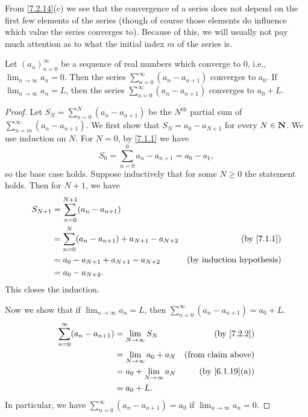 \begin{note}
  From \cref{7.2.14}(c) we see that the convergence of a series does not depend on the first few elements of the series
  (though of course those elements do influence which value the series converges to).
  Because of this, we will usually not pay much attention as to what the initial index \(m\) of the series is.
\end{note}

\begin{lemma}\label{7.2.15}
  Let \((a_n)_{n = 0}^\infty\) be a sequence of real numbers which converge to \(0\), i.e., \(\lim_{n \to \infty} a_n = 0\).
  Then the series \(\sum_{n = 0}^\infty (a_n - a_{n + 1})\) converges to \(a_0\).
  If \(\lim_{n \to \infty} a_n = L\), then the series \(\sum_{n = 0}^\infty (a_n - a_{n + 1})\) converges to \(a_0 + L\).
\end{lemma}

\begin{proof}
  Let \(S_N = \sum_{n = 0}^N (a_n - a_{n + 1})\) be the \(N^{\text{th}}\) partial sum of \(\sum_{n = m}^\infty (a_n - a_{n + 1})\).
  We first show that \(S_N = a_0 - a_{N + 1}\) for every \(N \in \mathbf{N}\).
  We use induction on \(N\).
  For \(N = 0\), by \cref{7.1.1} we have
  \[
    S_0 = \sum_{n = 0}^0 a_n - a_{n + 1} = a_0 - a_1,
  \]
  so the base case holds.
  Suppose inductively that for some \(N \geq 0\) the statement holds.
  Then for \(N + 1\), we have
  \begin{align*}
    S_{N + 1} & = \sum_{n = 0}^{N + 1} (a_n - a_{n + 1})                                                      \\
              & = \sum_{n = 0}^N (a_n - a_{n + 1}) + a_{N + 1} - a_{N + 2} & \text{(by \cref{7.1.1})}         \\
              & = a_0 - a_{N + 1} + a_{N + 1} - a_{N + 2}                  & \text{(by induction hypothesis)} \\
              & = a_0 - a_{N + 2}.
  \end{align*}
  This closes the induction.

  Now we show that if \(\lim_{n \to \infty} a_n = L\), then \(\sum_{n = 0}^\infty (a_n - a_{n + 1}) = a_0 + L\).
  \begin{align*}
    \sum_{n = 0}^\infty (a_n - a_{n + 1}) & = \lim_{N \to \infty} S_N       & \text{(by \cref{7.2.2})}     \\
                                          & = \lim_{N \to \infty} a_0 + a_N & \text{(from claim above)}    \\
                                          & = a_0 + \lim_{N \to \infty} a_N & \text{(by \cref{6.1.19}(a))} \\
                                          & = a_0 + L.
  \end{align*}
  In particular, we have \(\sum_{n = 0}^\infty (a_n - a_{n + 1}) = a_0\) if \(\lim_{n \to \infty} a_n = 0\).
\end{proof}

